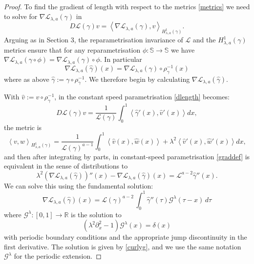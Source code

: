 \documentclass[a4paper,11pt]{amsart}
\theoremstyle{definition}\newtheorem*{definition}{Definition}
\theoremstyle{definition} \newtheorem{proposition}[theorem]{Proposition}
\theoremstyle{definition}\newtheorem{lemma}[theorem]{Lemma}
\theoremstyle{definition}\newtheorem{corollary}[theorem]{Corollary}
\theoremstyle{definition}\newtheorem{example}{Example}
\theoremstyle{remark}\newtheorem*{remark}{Remark}
\def\R{\mathbb{R}}
\def\S{\mathbb{S}}
\newcommand{\ip}[1]{{\left \langle {#1} \right \rangle}}
\def\length{\mathcal L}
\begin{document}
\begin{proof}
To find the gradient of length with respect to the metrics \eqref{metrics} we need to solve for $\nabla\length_{\lambda,a}(\gamma)$ in 
\begin{equation}\label{graddef}
D\length(\gamma) v =\ip{\nabla\length_{\lambda,a}(\gamma),v}_{H^1_{\lambda,a}(\gamma)}.
\end{equation}
Arguing as in \cite{schrader2023h} Section 3, the reparametrisation invariance of $\length$ and the $H^1_{\lambda,a}(\gamma)$ metrics ensure that for any reparametrisation $\phi:\S\to \S$ we have $\nabla\length_{\lambda,a}(\gamma\circ \phi)=\nabla\length_{\lambda,a}(\gamma)\circ \phi$. In particular
\begin{equation}\label{param}
\nabla\length_{\lambda,a}(\hat\gamma)(x)=\nabla\length_{\lambda,a}(\gamma)\circ \rho_\gamma^{-1}(x)
\end{equation}
where as above $\hat\gamma:=\gamma\circ \rho_\gamma^{-1}$. We therefore begin by calculating $\nabla\length_{\lambda,a}(\hat\gamma)$.

With $\hat v:=v\circ\rho_\gamma^{-1}$, in the constant speed parametrisation  \eqref{dlength} becomes:
\begin{equation*}
D\length(\gamma) v = \frac{1}{\length(\gamma)}\int_0^1 \ip{\hat \gamma'(x),\hat v'(x)} dx, 
\end{equation*}
the metric is
\[
\ip{v,w}_{H^1_{\lambda,a}(\gamma)}=\frac{1}{\length(\gamma)^{a-1}}\int_0^1 \ip{\hat v(x),\hat w(x)}+\lambda^2 \ip{\hat v'(x),\hat w'(x)} dx,
\]
and then after integrating by parts, in constant-speed parametrisation \eqref{graddef} is equivalent in the sense of distributions to
\[
\lambda^2(\nabla\length_{\lambda,a}(\hat\gamma))''(x)-\nabla\length_{\lambda,a}(\hat\gamma)(x)
=\length^{a-2} \hat\gamma''(x).
\]
We can solve this using the fundamental solution:
\begin{equation}\label{grad}
\nabla\length_{\lambda,a}(\hat\gamma)(x)=\length(\gamma)^{a-2}\,\int_0^{1}  \hat\gamma''(\tau)\mathcal{G}^{\lambda}(\tau-x)\, d\tau
\end{equation}
where $\mathcal G^{\lambda}:[0,1]\to \R $ is the solution to
\begin{equation}\label{delta2}
\left (\lambda^2\partial_x^2-1 \right )\mathcal G^{\lambda}(x)=\delta(x)
\end{equation}
with periodic boundary conditions and the appropriate jump discontinuity in the first derivative.
The solution is given by \eqref{curlyg},
and we use the same notation $\mathcal{G}^\lambda$ for the periodic extension.



\end{proof}
\end{document}
